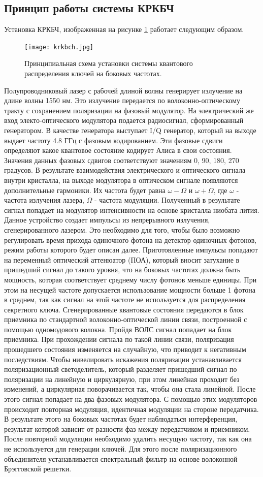 \subsection*{Принцип работы системы КРКБЧ}
Установка КРКБЧ, изображенная на рисунке \ref{fig:krkbch} работает следующим образом. 
\begin{figure}
    \centering
    \texttt{[image: krkbch.jpg]}
    \caption{Принципиальная схема установки системы квантового распределения ключей на боковых частотах.}
    \label{fig:krkbch} 
\end{figure}
Полупроводниковый лазер с рабочей длиной волны генерирует излучение на длине волны 1550 нм. Это излучение передается по волоконно-оптическому тракту с сохранением поляризации на фазовый модулятор.
На электрический же вход электо-оптического модулятора подается радиосигнал, сформированный генератором. В качестве генератора выступает I/Q генератор, который на выходе выдает частоту 4.8 ГГц с фазовым кодированием.
Эти фазовые сдвиги определяют какое квантовое состояние кодирует Алиса в свои состояния. Значения данных фазовых сдвигов соответствуют значениям {0, 90, 180, 270} градусов. 
В результате взаимодействия электрического и оптического сигнала внутри кристалла, на выходе модулятора в оптическом сигнале появляются дополнительные гармоники. Их частота будет равна $\omega - \Omega$ и $\omega + \Omega$, где $\omega$ - частота излучения лазера, $\Omega$ - частота модуляции.
Полученный в результате сигнал попадает на модулятор интенсивности на основе кристалла ниобата лития. Данное устройство создает импульсы из непрерывного излучения, сгенерированного лазером. Это необходимо для того, чтобы было возможно регулировать время прихода одиночного фотона на детектор одиночных фотонов, режим работы которого будет описан далее.
Приготовленные импульсы попадают на переменный оптический аттенюатор (ПОА), который вносит затухание в пришедший сигнал до такого уровня, что на боковых частотах должна быть мощность, которая соответствует среднему числу фотонов меньше единицы.
При этом на несущей частоте допускается использование мощности больше 1 фотона в среднем, так как сигнал на этой частоте не используется для распределения секретного ключа.
Сгенерированные квантовые состояния передаются в блок приемника по стандартной волоконно-оптической линии связи, построенной с помощью одномодового волокна. 
Пройдя ВОЛС сигнал попадает на блок приемника. 
При прохождении сигнала по такой линии связи, поляризация прошедшего состояния изменяется на случайную, что приводит к негативным последствиям. Чтобы нивелировать искажения поляризации устанавливается поляризационный светоделитель, который разделяет пришедший сигнал по поляризации на линейную и циркулярную, при этом линейная проходит без изменений, а циркулярная поворачивается так, чтобы она стала линейной. После этого сигнал попадает на два фазовых модулятора. С помощью этих модуляторов происходит повторная модуляция, идентичная модуляции на стороне передатчика. В результате этого на боковых частотах будет наблюдаться интерференция, результат которой зависит от разности фаз между передатчиком и приемником. После повторной модуляции необходимо удалить несущую частоту, так как она не используется для генерации ключей. Для этого после поляризационного объединителя устанавливается спектральный фильтр на основе волоконной Брэгговской решетки.
